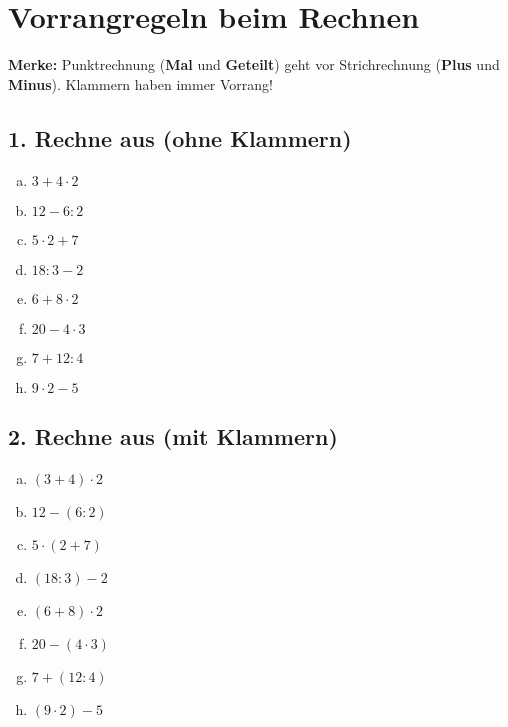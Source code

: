 
\section*{Vorrangregeln beim Rechnen}

\textbf{Merke:} Punktrechnung (\textbf{Mal} und \textbf{Geteilt}) geht vor Strichrechnung (\textbf{Plus} und \textbf{Minus}). Klammern haben immer Vorrang!

\begin{center}
\end{center}

\subsection*{1. Rechne aus (ohne Klammern)}
\begin{multicols}{2}
\begin{enumerate}[a)]
    \item $3 + 4 \cdot 2$
    \item $12 - 6 : 2$
    \item $5 \cdot 2 + 7$
    \item $18 : 3 - 2$
    \item $6 + 8 \cdot 2$
    \item $20 - 4 \cdot 3$
    \item $7 + 12 : 4$
    \item $9 \cdot 2 - 5$
\end{enumerate}
\end{multicols}

\subsection*{2. Rechne aus (mit Klammern)}
\begin{multicols}{2}
\begin{enumerate}[a)]
    \item $(3 + 4) \cdot 2$
    \item $12 - (6 : 2)$
    \item $5 \cdot (2 + 7)$
    \item $(18 : 3) - 2$
    \item $(6 + 8) \cdot 2$
    \item $20 - (4 \cdot 3)$
    \item $7 + (12 : 4)$
    \item $(9 \cdot 2) - 5$
\end{enumerate}
\end{multicols}

